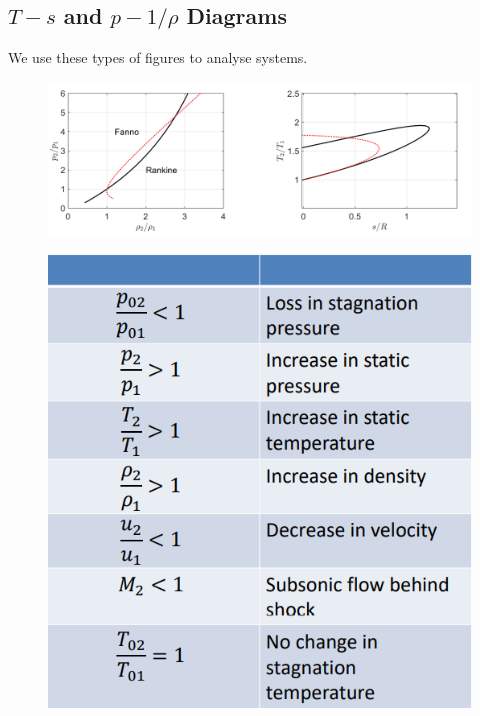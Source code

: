 \subsection{$T-s$ and $p-{1/\rho}$ Diagrams}
We use these types of figures to analyse systems.
\begin{figure}[H]
    \centering
    \includegraphics[width = 1 \textwidth]{./img/diagram8.PNG}
    \caption{}
\end{figure}
\begin{figure}[H]
    \centering
    \includegraphics[width = 0.5 \textwidth]{./img/diagram9.PNG}
    \caption{}
\end{figure}